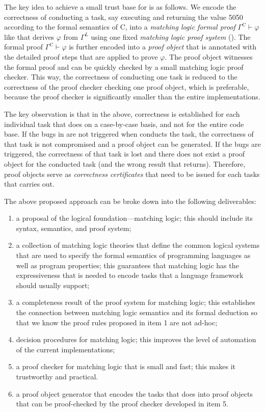 \documentclass[11pt]{article}
\begin{document}
The key idea to achieve a small trust base for \K is as follows. 
We encode the correctness of \K conducting a task,
say executing  and returning the value 5050 according to the formal semantics of C, 
into a \emph{matching logic formal proof}
$\Gamma^\textrm{C} \vdash \varphi$ like 
that derives $\varphi$ from $\Gamma^L$ using one fixed 
\emph{matching logic proof system} (). 
The formal proof $\Gamma^\textrm{C} \vdash \varphi$ is further encoded into a 
\emph{proof object} that is annotated with the detailed proof steps
that are applied to prove $\varphi$.
The proof object witnesses the formal proof
and can be quickly checked by a small matching logic proof checker. 
This way, the correctness of \K conducting one task is reduced to
the correctness of the proof checker checking one proof object,
which is preferable,
because the proof checker is significantly smaller than the 
entire \K implementations. 

The key observation is that in the above, 
correctness is established for each individual task that \K does 
on a case-by-case basis, and not for the entire \K code base. 
If the bugs in \K are not triggered when \K conducts the task, the correctness 
of that task is not compromised and a proof object can be generated. 
If the bugs are triggered, the correctness of that task is lost and there does 
not exist a proof object for the conducted task (and the wrong result that \K 
returns). 
Therefore, proof objects serve as \emph{correctness certificates}
that need to be issued for each tasks that \K carries out. 

The above proposed approach can be broke down into the following deliverables:
\begin{enumerate}
\item a proposal of the logical foundation---matching logic; this should 
include its syntax, semantics, and proof system;
\item a collection of matching logic theories that define the common logical 
systems that are used to specify the formal semantics of programming 
languages as well as program properties; this guarantees that matching logic 
has the expressiveness that is needed to encode tasks that a language framework 
should usually support;
\item a completeness result of the proof system for matching logic;
this establishes the connection between matching logic semantics and its formal 
deduction so that we know the proof rules proposed in item 1 are not ad-hoc;
\item decision procedures for matching logic; this improves the level of 
automation of the current \K implementations;
\item a proof checker for matching logic that is small and fast; this makes it 
trustworthy and practical.
\item a proof object generator that encodes the tasks that \K does into
proof objects that can be proof-checked by the proof checker developed in item 
5. 
\end{enumerate}
\end{document}
